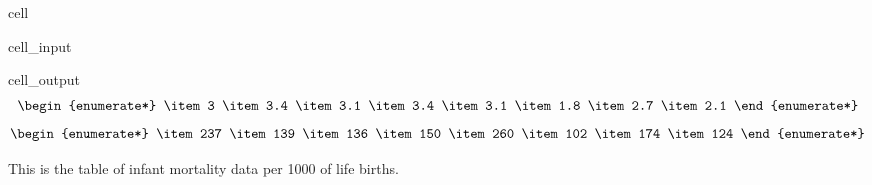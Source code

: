 \documentclass[letterpaper,10pt,english]{jupyterBook}
\begin{document}
\begin{sphinxuseclass}{cell}\begin{sphinxVerbatimInput}

\begin{sphinxuseclass}{cell_input}
\begin{sphinxVerbatim}[commandchars=\\\{\}]

\end{sphinxVerbatim}

\end{sphinxuseclass}\end{sphinxVerbatimInput}
\begin{sphinxVerbatimOutput}

\begin{sphinxuseclass}{cell_output}\begin{equation*}
\begin{split}\begin{enumerate*}
\item 3
\item 3.4
\item 3.1
\item 3.4
\item 3.1
\item 1.8
\item 2.7
\item 2.1
\end{enumerate*}\end{split}
\end{equation*}\begin{equation*}
\begin{split}\begin{enumerate*}
\item 237
\item 139
\item 136
\item 150
\item 260
\item 102
\item 174
\item 124
\end{enumerate*}\end{split}
\end{equation*}
\end{sphinxuseclass}\end{sphinxVerbatimOutput}

\end{sphinxuseclass}
\sphinxAtStartPar
This is the table of infant mortality data per 1000 of life births.
\end{document}
